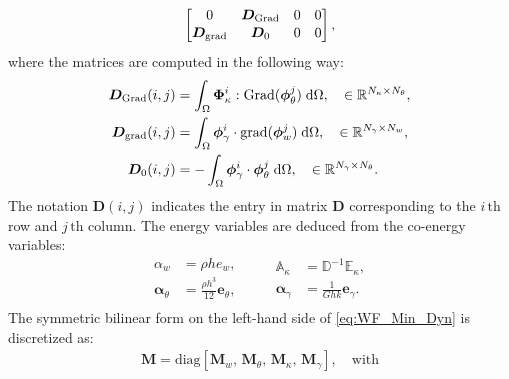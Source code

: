 \documentclass[11t]{article}
\begin{document}
{\begin{equation}
\begin{bmatrix}
		0 & \bm{D}_{\mathrm{Grad}} & 0 & 0         \vspace{.3mm}\\
		\bm{D}_{\mathrm{grad}} & \bm{D}_0 & 0 & 0       \vspace{.3mm}\\
		\end{bmatrix},
		\end{equation}
		where the matrices are computed in the following way:
		\begin{equation}
		\begin{aligned}
		\bm{D}_{\mathrm{Grad}}(i,j) &= \int_{\Omega} \bm{\Phi}_{\kappa}^i : \mathrm{Grad} (\bm{\phi}_{\theta}^j) \d\Omega, \quad \in \mathbb{R}^{N_\kappa \times N_\theta},\\
		\bm{D}_{\mathrm{grad}}(i,j) &= \int_{\Omega} \bm{\phi}_{\gamma}^i \cdot  \mathrm{grad}(\bm{\phi}^j_{w}) \d\Omega, \quad \in \mathbb{R}^{N_{\gamma} \times N_w},\\
		\bm{D}_0(i,j)  &= -\int_{\Omega} \bm{\phi}_{\gamma}^i \cdot  \bm{\phi}^j_{\theta} \d\Omega, \quad \in \mathbb{R}^{N_{\gamma} \times N_\theta}. \\
		\end{aligned}
		\end{equation}
		The notation $\bm{D}(i,j)$ indicates the entry in matrix $\bm{D}$ corresponding to the $i \, {\text{th}}$ row and $j \,{\text{th}}$ column. The energy variables are deduced from the co-energy variables:
		\begin{equation}
		\begin{aligned}
		\alpha_w &= \rho h e_w, \\
		\bm\alpha_{\theta} &=  \frac{\rho h^3}{12} \bm{e}_{\theta}, \\
		\end{aligned} \qquad
		\begin{aligned}
		\mathbb{A}_{\kappa} &= \mathbb{D}^{-1} \mathbb{E}_{\kappa}, \\
		\bm\alpha_{\gamma} &= \frac{1}{G h k} \bm{e}_{\gamma}. \\
		\end{aligned}
		\end{equation}
		The symmetric bilinear form on the left-hand side of \eqref{eq:WF_Min_Dyn} is discretized as:
		\begin{equation}
		\begin{gathered}
		\bm{M} = \text{diag}[\bm{M}_w,\, \bm{M}_\theta,\, \bm{M}_\kappa,\, \bm{M}_{\gamma}], \quad \text{with} \\
		\begin{aligned}

\end{aligned}
\end{gathered}
\end{equation}}
\end{document}

